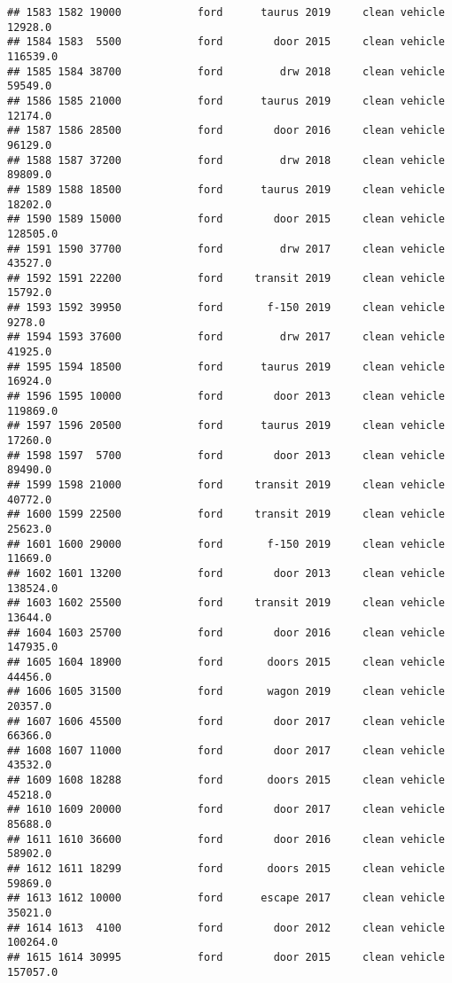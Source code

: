 \documentclass[
]{article}
\begin{document}
\begin{verbatim}
## 1583 1582 19000            ford      taurus 2019     clean vehicle   12928.0
## 1584 1583  5500            ford        door 2015     clean vehicle  116539.0
## 1585 1584 38700            ford         drw 2018     clean vehicle   59549.0
## 1586 1585 21000            ford      taurus 2019     clean vehicle   12174.0
## 1587 1586 28500            ford        door 2016     clean vehicle   96129.0
## 1588 1587 37200            ford         drw 2018     clean vehicle   89809.0
## 1589 1588 18500            ford      taurus 2019     clean vehicle   18202.0
## 1590 1589 15000            ford        door 2015     clean vehicle  128505.0
## 1591 1590 37700            ford         drw 2017     clean vehicle   43527.0
## 1592 1591 22200            ford     transit 2019     clean vehicle   15792.0
## 1593 1592 39950            ford       f-150 2019     clean vehicle    9278.0
## 1594 1593 37600            ford         drw 2017     clean vehicle   41925.0
## 1595 1594 18500            ford      taurus 2019     clean vehicle   16924.0
## 1596 1595 10000            ford        door 2013     clean vehicle  119869.0
## 1597 1596 20500            ford      taurus 2019     clean vehicle   17260.0
## 1598 1597  5700            ford        door 2013     clean vehicle   89490.0
## 1599 1598 21000            ford     transit 2019     clean vehicle   40772.0
## 1600 1599 22500            ford     transit 2019     clean vehicle   25623.0
## 1601 1600 29000            ford       f-150 2019     clean vehicle   11669.0
## 1602 1601 13200            ford        door 2013     clean vehicle  138524.0
## 1603 1602 25500            ford     transit 2019     clean vehicle   13644.0
## 1604 1603 25700            ford        door 2016     clean vehicle  147935.0
## 1605 1604 18900            ford       doors 2015     clean vehicle   44456.0
## 1606 1605 31500            ford       wagon 2019     clean vehicle   20357.0
## 1607 1606 45500            ford        door 2017     clean vehicle   66366.0
## 1608 1607 11000            ford        door 2017     clean vehicle   43532.0
## 1609 1608 18288            ford       doors 2015     clean vehicle   45218.0
## 1610 1609 20000            ford        door 2017     clean vehicle   85688.0
## 1611 1610 36600            ford        door 2016     clean vehicle   58902.0
## 1612 1611 18299            ford       doors 2015     clean vehicle   59869.0
## 1613 1612 10000            ford      escape 2017     clean vehicle   35021.0
## 1614 1613  4100            ford        door 2012     clean vehicle  100264.0
## 1615 1614 30995            ford        door 2015     clean vehicle  157057.0

\end{verbatim}
\end{document}
